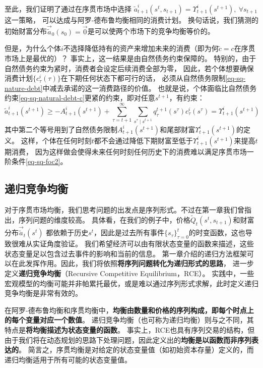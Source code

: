至此，我们证明了通过在序贯市场中选择
$\tilde{a}_{t+1}^i\left(s^t,s_{t+1}\right)=\Upsilon_{t+1}^i\left(s^{t+1}\right), ~\forall s_{t+1}$这一策略，
可以达成与阿罗-德布鲁均衡相同的消费计划。
换句话说，我们猜测的初始财富分布$\vec{\tilde{a}}_0\left(s_0\right)=\vec{0}$是可以使两个市场下的竞争均衡等价的。

但是，为什么个体$i$不选择降低持有的资产来增加未来的消费（即为何$\tilde{c}=c$在序贯市场上是最优的）？
事实上，这一结果是由自然债务约束保障的。
特别的，由于自然债务约束为紧时，消费者会设定后续消费全部为零，
因此，若个体想要确保消费计划$\{c_{\tau}^i\left(\tau\right)\}$在下期任何状态下都可行的话，
必须从自然债务限制\ref{eq-sq-nature-debt}中减去承诺的这一消费路径的价值。
也就是说，个体面临比自然债务约束\ref{eq-sq-natural-debt-c}更紧的约束，即对任意$s^{t+1}$，有约束：
\begin{equation*}
    \tilde{a}_{t+1}^i\left(s^{t+1}\right) \geq 
        -A_{t+1}^i\left(s^{t+1}\right)
            +\sum_{\tau=t+1}^{\infty} \sum_{s^\tau \mid s^{t+1}} q_\tau^{t+1}\left(s^\tau\right) c_\tau^i\left(s^\tau\right)
                =\Upsilon_{t+1}^i\left(s^{t+1}\right)
\end{equation*}
其中第二个等号用到了自然债务限制$A_{t+1}^i\left(s^{t+1}\right)$和尾部财富$\Upsilon_{t+1}^i\left(s^{t+1}\right)$的定义。
这样，个体在任何时刻$t$都不会通过降低下期财富至低于$\Upsilon_{t+1}^i\left(s^{t+1}\right)$来提高$t$期消费，
因为这样做会使得未来任何时刻任何历史下的消费难以满足序贯市场一阶条件\ref{eq-sq-foc2}。


\subsection{递归竞争均衡}

对于序贯市场均衡，我们思考问题的出发点是序列形式。不过在第一章我们曾指出，序列问题的维度较高。
具体看，在我们的例子中，价格$\tilde{Q}_t\left(s^t,s_{t+1}\right)$和财富分布$\vec{\tilde{a}}_t\left(s^t\right)$
都依赖于历史$s^t$，因此是过去所有事件$\{s_{\tau}\}_{\tau=0}^t$的时变函数，这也导致很难从实证角度验证。
我们希望经济可以由有限状态变量的函数来描述，这些状态变量足以包含过去事件的影响和当前的信息。
第一章介绍的递归方法框架可以在此发挥作用。因此，我们将依照\textbf{将序列问题转化为递归形式的思路}，
进一步定义\textbf{递归竞争均衡}（Recursive Competitive Equilibrium，RCE）。
实践中，一些宏观模型的均衡可能并非帕累托最优，或是难以通过序列形式求解，此时定义递归竞争均衡是非常有效的。

在阿罗-德布鲁均衡和序贯均衡中，\textbf{均衡由数量和价格的序列构成，即每个时点上的每个变量对应一个数值}。
递归竞争均衡（也可称为递归均衡）则与之不同，其特点是\textbf{将均衡描述为状态变量的函数}。
事实上，RCE也具有序列交易的结构，但由于我们将在动态规划的思路下处理问题，因此定义出的\textbf{均衡是以函数而非序列表达的}。
简言之，序贯均衡是对给定的状态变量值（如初始资本存量）定义的，而递归均衡适用于所有可能的状态变量值。


